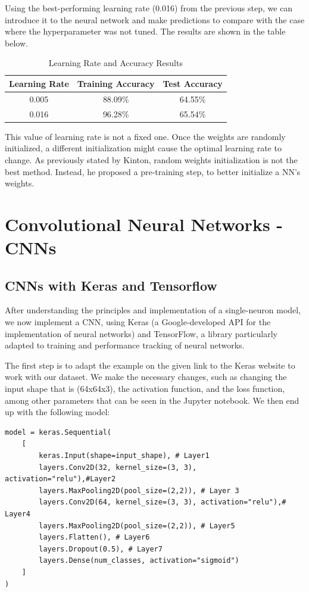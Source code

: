\documentclass{thesisreport}
\begin{document}
Using the best-performing learning rate (0.016) from the previous step, we can introduce it to the neural network and make predictions to compare with the case where the hyperparameter was not tuned. The results are shown in the table below.

\begin{table}[H]
\centering
\begin{tabular}{|c|c|c|}
\hline
\textbf{Learning Rate} & \textbf{Training Accuracy} & \textbf{Test Accuracy} \\
\hline
0.005 & 88.09\% & 64.55\% \\
\hline
0.016 & 96.28\% & 65.54\% \\
\hline
\end{tabular}
\caption{Learning Rate and Accuracy Results}
\label{tab:learning_rates}
\end{table}
This value of learning rate is not a fixed one. Once the weights are randomly initialized, a different initialization might cause the optimal learning rate to change. As previously stated by Kinton, random weights initialization is not the best method. Instead, he proposed a pre-training step, to better initialize a NN's weights. 

\newpage

\chapter{Convolutional Neural Networks - CNNs}

\section{CNNs with Keras and Tensorflow}
After understanding the principles and implementation of a single-neuron model, we now implement a CNN, using Keras (a Google-developed API for the implementation of neural networks) and TensorFlow, a library particularly adapted to training and performance tracking of neural networks.

The first step is to adapt the example on the given link to the Keras website to work with our dataset. We make the necessary changes, such as changing the input shape that is (64x64x3), the activation function, and the loss function, among other parameters that can be seen in the Jupyter notebook. We then end up with the following model:

\begin{lstlisting}[basicstyle=\small]
model = keras.Sequential(
    [
        keras.Input(shape=input_shape), # Layer1
        layers.Conv2D(32, kernel_size=(3, 3), activation="relu"),#Layer2
        layers.MaxPooling2D(pool_size=(2,2)), # Layer 3
        layers.Conv2D(64, kernel_size=(3, 3), activation="relu"),# Layer4
        layers.MaxPooling2D(pool_size=(2,2)), # Layer5
        layers.Flatten(), # Layer6
        layers.Dropout(0.5), # Layer7
        layers.Dense(num_classes, activation="sigmoid")             
    ]
)
\end{lstlisting}
\end{document}
